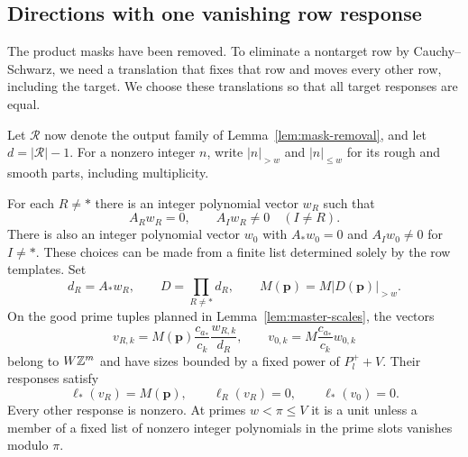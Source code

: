 \subsection{Directions with one vanishing row response}

The product masks have been removed.  To eliminate a nontarget row by
Cauchy--Schwarz, we need a translation that fixes that row and moves
every other row, including the target.  We choose these translations so
that all target responses are equal.

Let $\mathcal R$ now denote the output family of
Lemma~\ref{lem:mask-removal}, and let $d=|\mathcal R|-1$.
For a nonzero integer $n$, write $|n|_{>w}$ and $|n|_{\le w}$ for its
rough and smooth parts, including multiplicity.

\begin{lemma}
\label{lem:row-directions}
For each $R\ne *$ there is an integer polynomial vector $w_R$ such that
\[
 A_Rw_R=0,\qquad A_Iw_R\ne0\quad(I\ne R).
\]
There is also an integer polynomial vector $w_0$ with
$A_*w_0=0$ and $A_Iw_0\ne0$ for $I\ne *$.
These choices can be made from a finite list determined solely by the
row templates.  Set
\begin{equation}
 d_R=A_*w_R,\qquad D=\prod_{R\ne *}d_R,\qquad
 M(\boldsymbol p)=M|D(\boldsymbol p)|_{>w}.
 \label{eq:correlation-modulus}
\end{equation}
On the good prime tuples planned in Lemma~\ref{lem:master-scales},
the vectors
\begin{equation}
 v_{R,k}=M(\boldsymbol p)\frac{c_{a_*}}{c_k}
                  \frac{w_{R,k}}{d_R},\qquad
 v_{0,k}=M\frac{c_{a_*}}{c_k}w_{0,k}
 \label{eq:correlation-integer-directions}
\end{equation}
belong to $W\mathbb Z^m$ and have sizes bounded by a fixed power of
$P_l^++V$.  Their responses satisfy
\begin{equation}
 \ell_*(v_R)=M(\boldsymbol p),\qquad
 \ell_R(v_R)=0,\qquad \ell_*(v_0)=0.
 \label{eq:correlation-direction-responses}
\end{equation}
Every other response is nonzero.  At primes $w<\pi\le V$ it is a unit
unless a member of a fixed list of nonzero integer polynomials in the
prime slots vanishes modulo $\pi$.
\end{lemma}


